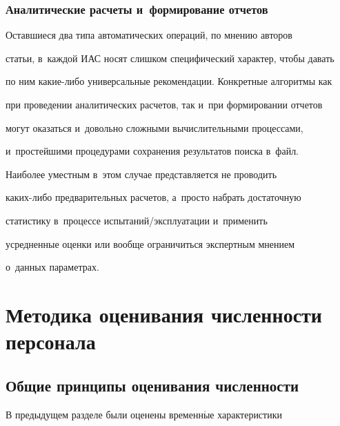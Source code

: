       


      \vspace*{-6pt}


      


      \subsubsection{Аналитические расчеты и~формирование отчетов}


      


      Оставшиеся два типа автоматических операций, по мнению авторов 


статьи, в~каждой ИАС носят слишком специфический характер, чтобы давать 


по ним ка\-кие-ли\-бо универсальные рекомендации. Конкретные алгоритмы как 


при проведении аналитических расчетов, так и~при формировании отчетов 


могут оказаться и~довольно сложными вычислительными процессами, 


и~простейшими процедурами сохранения результатов поиска в~файл. 


Наиболее уместным в~этом случае представляется не проводить  


ка\-ких-ли\-бо предварительных расчетов, а~просто набрать достаточную 


статистику в~процессе ис\-пы\-та\-ний/экс\-плу\-а\-та\-ции и~применить 


усредненные оценки или вообще ограничиться экспертным мнением 


о~данных параметрах.


      


\section{Методика оценивания численности персонала}





\subsection{Общие принципы оценивания численности}





      В предыдущем разделе были оценены временн$\acute{\mbox{ы}}$е характеристики 



